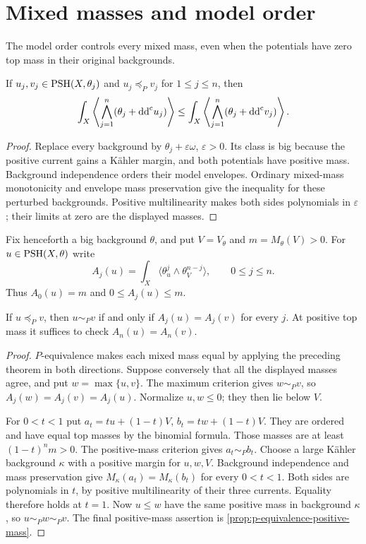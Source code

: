 \section{Mixed masses and model order}
\label{sec:p-order-mixed-masses}
The model order controls every mixed mass, even when the potentials have zero top mass in their original backgrounds.

\begin{theorem}\label{thm:p-order-mixed-mass-monotonicity}
If $u_j,v_j\in\mathrm{PSH}(X,\theta_j)$ and $u_j\preceq_P v_j$ for $1\leq j\leq n$, then
\[
 \int_X\left\langle\bigwedge_{j=1}^n(\theta_j+\mathrm{dd}^{\mathrm{c}} u_j)\right\rangle
 \leq
 \int_X\left\langle\bigwedge_{j=1}^n(\theta_j+\mathrm{dd}^{\mathrm{c}} v_j)\right\rangle.
\]
\end{theorem}
\begin{proof}
Replace every background by $\theta_j+\varepsilon\omega$, $\varepsilon>0$. Its class is big because the positive current gains a K\"ahler margin, and both potentials have positive mass. Background independence orders their model envelopes. Ordinary mixed-mass monotonicity and envelope mass preservation give the inequality for these perturbed backgrounds. Positive multilinearity makes both sides polynomials in $\varepsilon$; their limits at zero are the displayed masses.
\end{proof}

Fix henceforth a big background $\theta$, and put $V=V_\theta$ and $m=M_\theta(V)>0$. For $u\in\mathrm{PSH}(X,\theta)$ write
\[
 A_j(u)=\int_X\langle\theta_u^j\wedge\theta_V^{n-j}\rangle,
                          \qquad0\leq j\leq n.
\]
Thus $A_0(u)=m$ and $0\leq A_j(u)\leq m$.

\begin{theorem}\label{thm:p-equivalence-mixed-mass-criterion}
If $u\preceq_P v$, then $u\sim_P v$ if and only if $A_j(u)=A_j(v)$ for every $j$. At positive top mass it suffices to check $A_n(u)=A_n(v)$.
\end{theorem}
\begin{proof}
$P$-equivalence makes each mixed mass equal by applying the preceding theorem in both directions. Suppose conversely that all the displayed masses agree, and put $w=\max\{u,v\}$. The maximum criterion gives $w\sim_P v$, so $A_j(w)=A_j(v)=A_j(u)$. Normalize $u,w\leq0$; they then lie below $V$.

For $0<t<1$ put $a_t=tu+(1-t)V$, $b_t=tw+(1-t)V$. They are ordered and have equal top masses by the binomial formula. Those masses are at least $(1-t)^n m>0$. The positive-mass criterion gives $a_t\sim_P b_t$. Choose a large K\"ahler background $\kappa$ with a positive margin for $u,w,V$. Background independence and mass preservation give $M_\kappa(a_t)=M_\kappa(b_t)$ for every $0<t<1$. Both sides are polynomials in $t$, by positive multilinearity of their three currents. Equality therefore holds at $t=1$. Now $u\leq w$ have the same positive mass in background $\kappa$, so $u\sim_P w\sim_P v$. The final positive-mass assertion is \cref{prop:p-equivalence-positive-mass}.
\end{proof}

